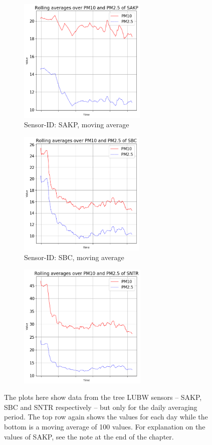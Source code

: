 \documentclass[12pt,a4paper,twoside]{scrartcl}
\numberwithin{equation}{section}
\begin{document}
\begin{figure}[H]
  \begin{subfigure}[t]{0.32\textwidth}
    \includegraphics[width=\textwidth,height=6cm]{figures/plots_1d/SAKP_rolling_avg}%
    \caption{Sensor-ID: SAKP, moving average}
  \end{subfigure}
  \begin{subfigure}[t]{0.32\textwidth}
    \includegraphics[width=\textwidth,height=6cm]{figures/plots_1d/SBC_rolling_avg}%
    \caption{Sensor-ID: SBC, moving average}
  \end{subfigure}
  \begin{subfigure}[t]{0.32\textwidth}
    \includegraphics[width=\textwidth,height=6cm]{figures/plots_1d/SNTR_rolling_avg}%
  \end{subfigure}      
  \caption[LUBW Data Plots]{The plots here show data from the tree LUBW sensors -- SAKP, SBC and SNTR respectively -- but only for the daily averaging period. The top row again shows the values for each day while the bottom is a moving average of 100 values. For explanation on the values of SAKP, see the note at the end of the chapter.}\label{fig:lubw-plots}
\end{figure}
\end{document}
